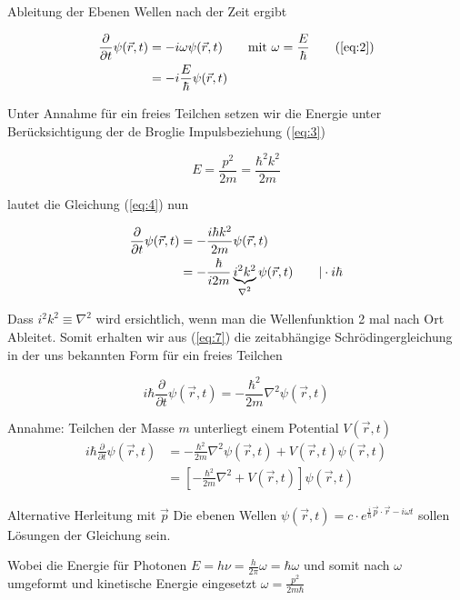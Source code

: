 Ableitung der Ebenen Wellen nach der Zeit ergibt

\begin{align}
  \label{eq:4}
   \frac{\partial}{\partial t}\psi(\vec{r},t) &= -i \omega \psi(\vec{r},t) \qquad \text{mit } \omega=\frac{E}{\hbar} \qquad (\ref{eq:2}) \\
&= -i \frac{E}{\hbar} \psi(\vec{r},t) 
\end{align}

Unter Annahme für ein freies Teilchen setzen wir die Energie unter Berücksichtigung der de Broglie Impulsbeziehung (\ref{eq:3})

\begin{equation}
  \label{eq:6}
  E=\frac{p^2}{2m}=\frac{\hbar^2k^2}{2m}
\end{equation}


lautet die Gleichung (\ref{eq:4}) nun

\begin{align}
  \label{eq:7}
  \frac{\partial}{\partial t}\psi(\vec{r},t) &=-\frac{i\hbar k^2}{2m}  \psi(\vec{r},t) \notag \\
 &=-\frac{\hbar}{i2m} \underbr{i^2k^2}_{\nabla^2} \psi(\vec{r},t) \qquad |\cdot i\hbar
\end{align}

Dass \(i^2k^2\equiv \nabla^2\) wird ersichtlich, wenn man die Wellenfunktion 2 mal nach Ort Ableitet. Somit erhalten wir aus (\ref{eq:7}) die zeitabhängige Schrödingergleichung in der uns bekannten Form für ein freies Teilchen

  \begin{equation}
    \label{eq:11}
    \boxed{i\hbar\frac{\partial}{\partial t}\psi(\vec{r},t)
      =-\frac{\hbar^2}{2m}\nabla^2\psi(\vec{r},t)}
  \end{equation}


Annahme: Teilchen der Masse $m$ unterliegt einem Potential $V(\vec{r},t)$
\begin{align*}
  i\hbar\frac{\partial}{\partial t}\psi(\vec{r},t) 
  &=-\frac{\hbar^{2}}{2m}\nabla^2\psi(\vec{r},t)+V(\vec{r},t)\psi(\vec{r},t)\\
  &=\left[-\frac{\hbar^{2}}{2m}\nabla^2+V(\vec{r},t)\right]\psi(\vec{r},t)
\end{align*}
\newpage

Alternative Herleitung mit \(\vec p\)
Die ebenen Wellen \(\psi(\vec{r},t)=c\cdot  e^{\frac{i}{\hbar}\vec{p}\cdot\vec{r}-i\omega t}\) sollen  Lösungen der Gleichung sein. 

Wobei die Energie für Photonen \(E=h\nu=\frac{h}{2\pi}\omega=\hbar\omega\) und somit nach \(\omega\) umgeformt und kinetische Energie eingesetzt \(\omega = \frac{p^2}{2m\hbar}\)  \\

